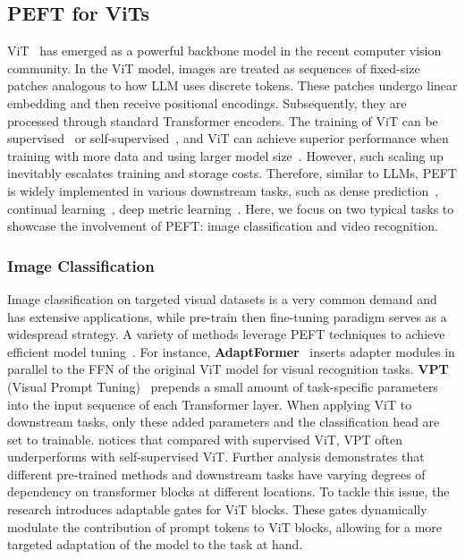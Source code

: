 \subsection{PEFT for ViTs}
\label{peft_on_vit}

ViT~\cite{dosovitskiy2010image} has emerged as a powerful backbone model in the recent computer vision community.
In the ViT model, images are treated as sequences of fixed-size patches analogous to how LLM uses discrete tokens. These patches undergo linear embedding and then receive positional encodings. Subsequently, they are processed through standard Transformer encoders. 
The training of ViT can be supervised~\cite{dosovitskiy2010image,steiner2021train} or self-supervised~\cite{chenempirical,he2022masked}, and ViT can achieve superior performance when training with more data and using larger model size~\cite{dehghani2023scaling}. However, such scaling up inevitably escalates training and storage costs. Therefore, similar to LLMs, PEFT is widely implemented in various downstream tasks, such as dense prediction~\cite{chen2022vision}, continual learning~\cite{wang2022learning, gao2023unified}, deep metric learning~\cite{ren2024learning}. Here, we focus on two typical tasks to showcase the involvement of PEFT: image classification and video recognition.

\subsubsection{Image Classification}

Image classification on targeted visual datasets is a very common demand and has extensive applications, while pre-train then fine-tuning paradigm serves as a widespread strategy. A variety of methods leverage PEFT techniques to achieve efficient model tuning~\cite{jia2022visual,chen2022vision,chen2022adaptformer,jie2022convolutional}.
For instance, \textbf{AdaptFormer}~\cite{chen2022adaptformer} inserts adapter modules in parallel to the FFN of the original ViT model for visual recognition tasks. 
\textbf{VPT} (Visual Prompt Tuning)~\cite{jia2022visual} prepends a small amount of task-specific parameters into the input sequence of each Transformer layer. When applying ViT to downstream tasks, only these added parameters and the classification head are set to trainable. 
\textbf{\cite{yoo2023improving}} notices that compared with supervised ViT, VPT often underperforms with self-supervised ViT. Further analysis demonstrates that different pre-trained methods and downstream tasks have varying degrees of dependency on transformer blocks at different locations. To tackle this issue, the research introduces adaptable gates for ViT blocks. These gates dynamically modulate the contribution of prompt tokens to ViT blocks, allowing for a more targeted adaptation of the model to the task at hand.

